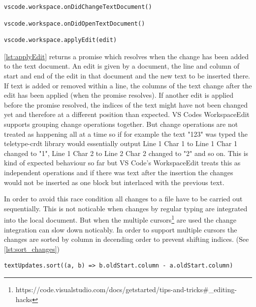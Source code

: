 \begin{lstlisting}[label={lst:onDidChangeTextDocument}, caption=VS Code API onDidChangeTextDocument]
vscode.workspace.onDidChangeTextDocument()
\end{lstlisting}

\begin{lstlisting}[label={lst:onDidOpenTextDocument}, caption=VS Code API onDidOpenTextDocument]
vscode.workspace.onDidOpenTextDocument()
\end{lstlisting}

\begin{lstlisting}[label={lst:applyEdit}, caption=VS Code API applyEdit]
vscode.workspace.applyEdit(edit)
\end{lstlisting}

\autoref{lst:applyEdit} returns a promise which resolves when the change has been added to the text document.
An edit is given by a document, the line and column of start and end of the edit in that document and the new text to be inserted there.
If text is added or removed within a line, the columns of the text change after the edit has been applied (when the promise resolves). If another edit is applied before the promise resolved, the indices of the text might have not been changed yet and therefore at a different position than expected. VS Codes WorkspaceEdit supports grouping change operations together. But change operations are not treated as happening all at a time so if for example the text "123" was typed the teletype-crdt library would essentially output Line 1 Char 1 to Line 1 Char 1 changed to "1", Line 1 Char 2 to Line 2 Char 2 changed to "2" and so on. This is kind of expected behaviour so far but VS Code's WorkspaceEdit treats this as independent operations and if there was text after the insertion the changes would not be inserted as one block but interlaced with the previous text. 

In order to avoid this race condition all changes to a file have to be carried out sequentially. This is not noticable when changes by regular typing are integrated into the local document. But when the multiple cursors\footnote{https://code.visualstudio.com/docs/getstarted/tips-and-tricks\#\_editing-hacks} are used the change integration can slow down noticably. In order to support multiple cursors the changes are sorted by column in decending order to prevent shifting indices. (See \autoref{lst:sort_changes})
\begin{lstlisting}[label={lst:sort_changes}, caption=Sorting Changes by Column to Prevent Index Shifting]
textUpdates.sort((a, b) => b.oldStart.column - a.oldStart.column)
\end{lstlisting}

